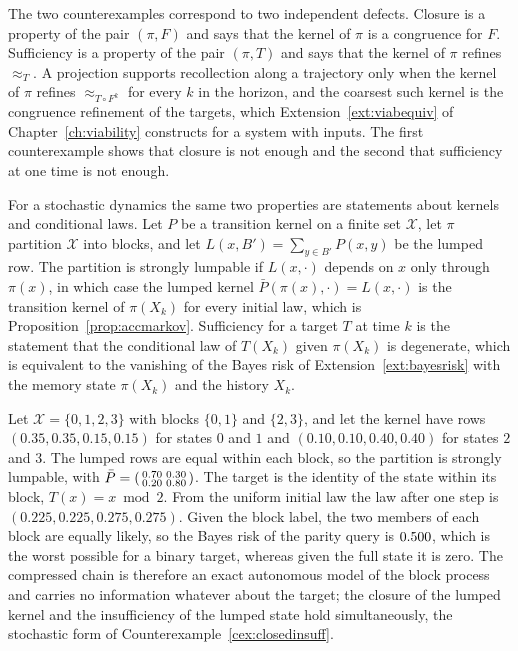 The two counterexamples correspond to two independent defects. Closure is a property of the pair $(\pi,F)$ and says that the kernel of $\pi$ is a congruence for $F$. Sufficiency is a property of the pair $(\pi,T)$ and says that the kernel of $\pi$ refines $\approx_T$. A projection supports recollection along a trajectory only when the kernel of $\pi$ refines $\approx_{T\circ F^k}$ for every $k$ in the horizon, and the coarsest such kernel is the congruence refinement of the targets, which Extension~\ref{ext:viabequiv} of Chapter~\ref{ch:viability} constructs for a system with inputs. The first counterexample shows that closure is not enough and the second that sufficiency at one time is not enough.

For a stochastic dynamics the same two properties are statements about kernels and conditional laws. Let $P$ be a transition kernel on a finite set $\mathcal X$, let $\pi$ partition $\mathcal X$ into blocks, and let $L(x,B')=\sum_{y\in B'}P(x,y)$ be the lumped row. The partition is strongly lumpable if $L(x,\cdot)$ depends on $x$ only through $\pi(x)$, in which case the lumped kernel $\bar P(\pi(x),\cdot)=L(x,\cdot)$ is the transition kernel of $\pi(X_k)$ for every initial law, which is Proposition~\ref{prop:accmarkov}. Sufficiency for a target $T$ at time $k$ is the statement that the conditional law of $T(X_k)$ given $\pi(X_k)$ is degenerate, which is equivalent to the vanishing of the Bayes risk of Extension~\ref{ext:bayesrisk} with the memory state $\pi(X_k)$ and the history $X_k$.

\begin{workedex}\label{ex:lumped36}
Let $\mathcal X=\{0,1,2,3\}$ with blocks $\{0,1\}$ and $\{2,3\}$, and let the kernel have rows $(0.35,0.35,0.15,0.15)$ for states $0$ and $1$ and $(0.10,0.10,0.40,0.40)$ for states $2$ and $3$. The lumped rows are equal within each block, so the partition is strongly lumpable, with $\bar P=\begin{psmallmatrix}0.70&0.30\\0.20&0.80\end{psmallmatrix}$. The target is the identity of the state within its block, $T(x)=x \bmod 2$. From the uniform initial law the law after one step is $(0.225,0.225,0.275,0.275)$. Given the block label, the two members of each block are equally likely, so the Bayes risk of the parity query is $0.500$, which is the worst possible for a binary target, whereas given the full state it is zero. The compressed chain is therefore an exact autonomous model of the block process and carries no information whatever about the target; the closure of the lumped kernel and the insufficiency of the lumped state hold simultaneously, the stochastic form of Counterexample~\ref{cex:closedinsuff}.
\end{workedex}

